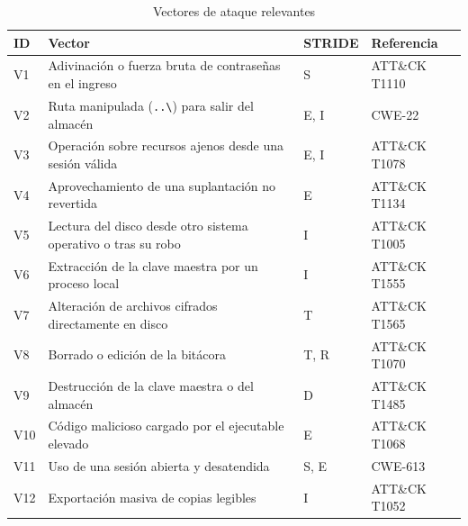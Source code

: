 \documentclass[conference]{IEEEtran}
\begin{document}
\begin{table}[!htb]
\caption{Vectores de ataque relevantes}
\label{tab:vectores}
\centering
\footnotesize
\setlength{\tabcolsep}{3pt}
\begin{tabular}{|l|p{3.5cm}|p{1.15cm}|p{2.0cm}|}
\hline
\textbf{ID} & \textbf{Vector} & \textbf{STRIDE} & \textbf{Referencia} \\
\hline
V1 & Adivinación o fuerza bruta de contraseñas en el ingreso & S & ATT\&CK T1110 \\
\hline
V2 & Ruta manipulada (\texttt{..\textbackslash}) para salir del almacén & E, I & CWE-22 \\
\hline
V3 & Operación sobre recursos ajenos desde una sesión válida & E, I & ATT\&CK T1078 \\
\hline
V4 & Aprovechamiento de una suplantación no revertida & E & ATT\&CK T1134 \\
\hline
V5 & Lectura del disco desde otro sistema operativo o tras su robo & I & ATT\&CK T1005 \\
\hline
V6 & Extracción de la clave maestra por un proceso local & I & ATT\&CK T1555 \\
\hline
V7 & Alteración de archivos cifrados directamente en disco & T & ATT\&CK T1565 \\
\hline
V8 & Borrado o edición de la bitácora & T, R & ATT\&CK T1070 \\
\hline
V9 & Destrucción de la clave maestra o del almacén & D & ATT\&CK T1485 \\
\hline
V10 & Código malicioso cargado por el ejecutable elevado & E & ATT\&CK T1068 \\
\hline
V11 & Uso de una sesión abierta y desatendida & S, E & CWE-613 \\
\hline
V12 & Exportación masiva de copias legibles & I & ATT\&CK T1052 \\
\hline
\end{tabular}
\end{table}
\end{document}
